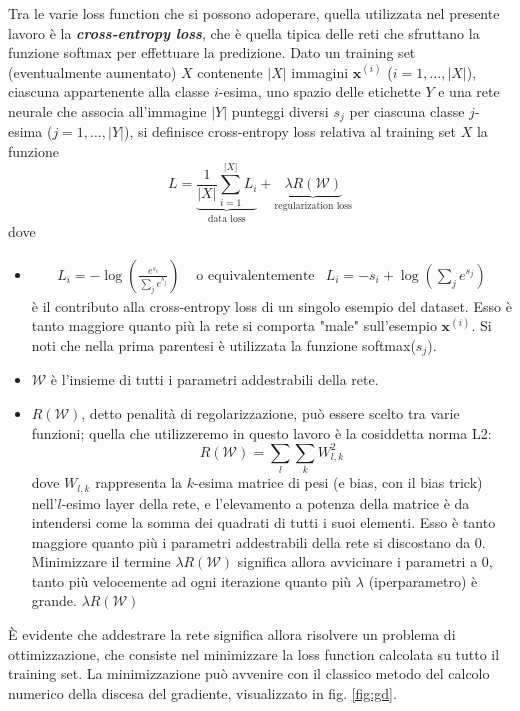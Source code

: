 Tra le varie loss function che si possono adoperare, quella utilizzata nel presente lavoro è la \textbf{\textit{cross-entropy loss}}, che è quella tipica delle reti che sfruttano la funzione softmax per effettuare la predizione.
Dato un training set (eventualmente aumentato) $X$ contenente $|X|$ immagini $\mathbf{x}^{(i)}$ ($i=1,\dots,|X|$), ciascuna appartenente alla classe $i$-esima, uno spazio delle etichette $Y$ e una rete neurale che associa all'immagine $|Y|$ punteggi diversi $s_j$ per ciascuna classe $j$-esima ($j=1,\dots,|Y|$), si definisce cross-entropy loss relativa al training set $X$ la funzione
\[
L=\underbrace{\frac{1}{|X|}\sum_{i=1}^{|X|}L_i}_{\text{data loss}}+\underbrace{\lambda R(\mathcal{W})}_{\text{regularization loss}}
\]
dove
\begin{itemize}
\item \begin{align*}
L_i=-\log\left(\frac{e^{s_i}}{\sum\nolimits_{j}e^{s_j}}\right) & \text{ o equivalentemente} & L_i=-s_i+\log\left(\sum\nolimits_{j}e^{s_j}\right)
\end{align*}
è il contributo alla cross-entropy loss di un singolo esempio del dataset. Esso è tanto maggiore quanto più la rete si comporta "male" sull'esempio $\mathbf{x}^{(i)}$. Si noti che nella prima parentesi è utilizzata la funzione softmax($s_j$).

\item $\mathcal{W}$ è l'insieme di tutti i parametri addestrabili della rete.

\item $R(\mathcal{W})$, detto penalità di regolarizzazione, può essere scelto tra varie funzioni; quella che utilizzeremo in questo lavoro è la cosiddetta norma L2:
\[
R(\mathcal{W}) = \sum_l\sum_k W_{l,k}^2
\]
dove $W_{l,k}$ rappresenta la $k$-esima matrice di pesi (e bias, con il bias trick) nell'$l$-esimo layer della rete, e l'elevamento a potenza della matrice è da intendersi come la somma dei quadrati di tutti i suoi elementi. Esso è tanto maggiore quanto più i parametri addestrabili della rete si discostano da 0. Minimizzare il termine $\lambda R(\mathcal{W})$ significa allora avvicinare i parametri a 0, tanto più velocemente ad ogni iterazione quanto più $\lambda$ (iperparametro) è grande.
$\lambda R(\mathcal{W})$

\end{itemize}

È evidente che addestrare la rete significa allora risolvere un problema di ottimizzazione, che consiste nel minimizzare la loss function calcolata su tutto il training set. La minimizzazione può avvenire con il classico metodo del calcolo numerico della discesa del gradiente, visualizzato in fig. \ref{fig:gd}.

